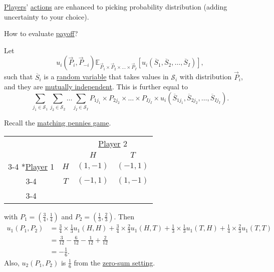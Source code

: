 \hyperref[def:player]{Players}' \hyperref[def:strategy]{actions} are enhanced to picking probability distribution (adding uncertainty to your choice).

\begin{problem}
How to evaluate \hyperref[def:reward]{payoff}?
\end{problem}
\begin{answer}
	Let
	\[
		u_{i}(\overrightarrow{P}_i, \overrightarrow{P}_{-i})
		\mathbb{E}_{\overrightarrow{P}_{1}\times \overrightarrow{P}_2 \times \dots \times \overrightarrow{P}_I}\left[ u_{i}\left(\overline{S}_1, \overline{S}_2, \dots , \overline{S}_I\right)\right],
	\]
	such that \(\overline{S}_i\) is a \hyperref[def:random-variable]{random variable} that takes values in \(\mathcal{S}_i\) with distribution \(\overrightarrow{P}_i\), and they are \hyperref[def:independent]{mutually independent}. This is further equal to
	\[
		\sum\limits_{j_1\in \mathcal{S}_1 }\sum\limits_{j_2\in \mathcal{S}_2}\dots \sum\limits_{j_I\in \mathcal{S}_I }P_{1j_1}\times P_{2j_2}\times \dots \times P_{Ij_I}\times u_{i}\left(\overline{S}_{1j_1}, \overline{S}_{2j_2}, \dots , \overline{S}_{Ij_I}\right).
	\]
\end{answer}

\begin{eg}
	Recall the \hyperref[eg:matching-pennies]{matching pennies game}.
	\begin{table}[H]
		\centering
		\setlength{\extrarowheight}{2pt}
		\begin{tabular}{cc|c|c|}
			                                               & \multicolumn{1}{c}{} & \multicolumn{2}{c}{\hyperref[def:player]{Player} 2}                           \\
			                                               & \multicolumn{1}{c}{} & \multicolumn{1}{c}{$H$}                             & \multicolumn{1}{c}{$T$} \\\cline{3-4}
			\multirow{2}*{\hyperref[def:player]{Player} 1} & $H$                  & $(1, -1)$                                           & $(-1, 1)$               \\\cline{3-4}
			                                               & $T$                  & $(-1, 1)$                                           & $(1, -1)$               \\\cline{3-4}
		\end{tabular}
	\end{table}
	with \(P_1 = (\frac{3}{4}, \frac{1}{4})\) and \(P_2 = (\frac{1}{3}, \frac{2}{3})\). Then
	\[
		\begin{split}
			u_1(P_1, P_2) &= \frac{3}{4}\times \frac{1}{3} u_1(H, H) + \frac{3}{4}\times \frac{2}{3}u_1(H, T) + \frac{1}{3}\times \frac{1}{3}u_1(T, H)+\frac{1}{4}\times \frac{2}{3}u_1(T, T)\\
			&= \frac{3}{12} - \frac{6}{12} - \frac{1}{12} + \frac{2}{12}\\
			&= -\frac{1}{6}.
		\end{split}
	\]
	Also, \(u_2(P_1, P_2)\) is \(\frac{1}{6}\) from the \hyperref[def:zero-sum-game]{zero-sum setting}.
\end{eg}

